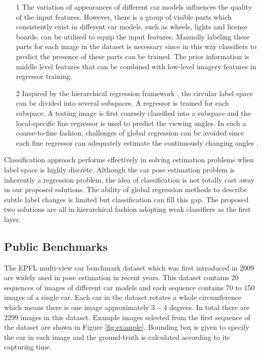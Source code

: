\documentclass{tutmscthesis}[2010/09/22]
\numberwithin{equation}{section}
\numberwithin{table}{section}
\numberwithin{figure}{section}
\begin{document}
\begin{itemize}
\item[1] The variation of appearances of different car models influences the quality of the input features.
However, there is a group of visible parts which consistently exist in different car models, such as wheels, lights and license boards, can be utilised to equip the input features.
Manually labeling these parts for each image in the dataset is necessary since in this way classifiers to predict the presence of these parts can be trained.
The prior information is middle level features that can be combined with low-level imagery features in regressor training.
 
\item[2] Inspired by the hierarchical regression framework \cite{foytik2013two}, the circular label space can be divided into several subspaces. 
A regressor is trained for each subspace.
A testing image is first coarsely classified into a subspace and the local-specific fine regressor  is used to predict the viewing angles.
In such a coarse-to-fine fashion, challenges of global regression can be avoided since each fine regressor can adequately estimate the continuously changing angles .
\end{itemize}

Classification approach performs effectively in solving estimation problems when label space is highly discrete. 
Although the car pose estimation problem is inherently a regression problem, the idea of classification is not totally cast away in our proposed solutions.
The ability of global regression methods to describe subtle label changes is limited but classification can fill this gap.
The proposed two solutions are all in hierarchical fashion adopting weak classifiers as the first layer. 



\subsection{Public Benchmarks}

The EPFL multi-view car benchmark dataset which was first introduced in 2009 \cite{ozuysal2009pose} are widely used in pose estimation in recent years.  
This dataset contains 20 sequences of images of different car models and each sequence contains 70 to 150 images of a single car.
Each car in the dataset rotates a whole circumference which means there is one image approximately $3-4$ degrees. 
In total there are 2299 images in this dataset. 
Example images selected from the first sequence of the dataset are shown in Figure \ref{fig:example}. 
Bounding box is given to specify the car in each image and the ground-truth is calculated according to its capturing time.
\end{document}
